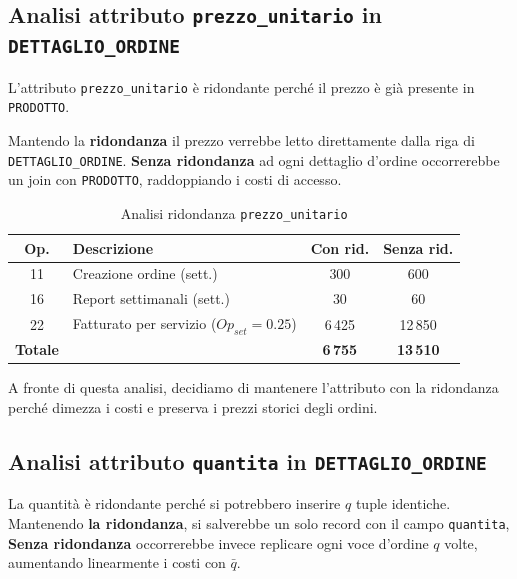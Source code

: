 \documentclass[a4paper,12pt]{report}
\begin{document}
\subsection{Analisi attributo \texttt{prezzo\_unitario} in \texttt{DETTAGLIO\_ORDINE}}
L’attributo \texttt{prezzo\_unitario} è ridondante perché il prezzo è già presente in \newline \texttt{PRODOTTO}.

Mantendo la \textbf{ridondanza} il prezzo verrebbe letto direttamente dalla riga di \newline \texttt{DETTAGLIO\_ORDINE}.
\textbf{Senza ridondanza} ad ogni dettaglio d’ordine occorrerebbe un join con \texttt{PRODOTTO}, raddoppiando
i costi di accesso.

\begin{table}[H]
	\centering
	\small
	\begin{tabular}{|c|l|c|c|}
		\hline
		\rowcolor{gray!20}
		\textbf{Op.}    & \textbf{Descrizione}                     & \textbf{Con rid.} & \textbf{Senza rid.} \\
		\hline
		11              & Creazione ordine (sett.)                 & 300               & 600                 \\
		16              & Report settimanali (sett.)               & 30                & 60                  \\
		22              & Fatturato per servizio ($Op_{set}=0.25$) & 6\,425            & 12\,850             \\
		\hline
		\textbf{Totale} &                                          & \textbf{6\,755}   & \textbf{13\,510}    \\
		\hline
	\end{tabular}
	\caption{Analisi ridondanza \texttt{prezzo\_unitario}}
\end{table}

\noindent
A fronte di questa analisi, decidiamo di mantenere l’attributo con la ridondanza perché dimezza i costi e preserva i prezzi storici degli ordini.

\subsection{Analisi attributo \texttt{quantita} in \texttt{DETTAGLIO\_ORDINE}}
La quantità è ridondante perché si potrebbero inserire $q$ tuple identiche.
Mantenendo \textbf{la ridondanza}, si salverebbe un solo record con il campo \texttt{quantita},
\textbf{Senza ridondanza} occorrerebbe invece replicare ogni voce d’ordine $q$ volte, aumentando linearmente i costi con $\bar{q}$.
\end{document}
